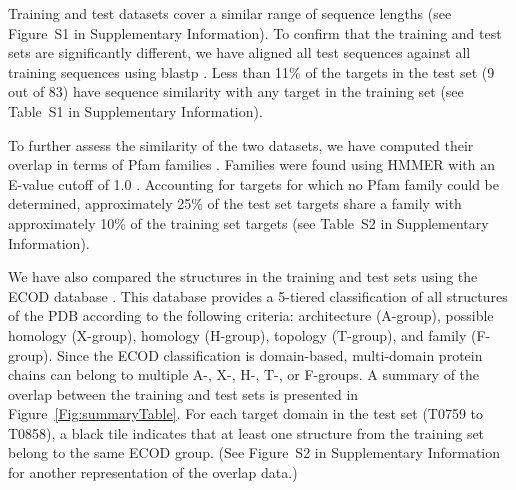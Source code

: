 \documentclass{bioinfo}
\begin{document}
Training and test datasets cover a similar range of sequence
lengths (see Figure~S1 in Supplementary Information). To confirm that the
training and test sets are significantly different, we have aligned
all test sequences against all training sequences using
blastp \citep{altschul1990basic}.  Less than 11\% of the targets in the
test set (9 out of 83) have sequence similarity with any target in the
training set (see Table~S1 in Supplementary Information).

To further assess the similarity of the two datasets, we have computed
their overlap in terms of Pfam families \citep{finn2016pfam}. 
Families were found using HMMER \citep{finn2015hmmer} with an E-value
cutoff of 1.0 \citep{finn2016pfam}.  Accounting for targets for which
no Pfam family could be determined, approximately 25\% of the test set
targets share a family with approximately 10\% of the training set
targets (see Table~S2 in Supplementary Information).

We have also compared the structures in the training and test sets
using the ECOD database \citep{cheng2014ecod}. This database provides a
5-tiered classification of all structures of the PDB
according to the following criteria:
architecture (A-group), possible homology (X-group), homology
(H-group), topology (T-group), and family (F-group).  Since the ECOD
classification is domain-based, multi-domain protein chains can belong
to multiple A-, X-, H-, T-, or F-groups.
%
A summary of the overlap between the training and test sets is
presented in Figure~\ref{Fig:summaryTable}. For each target domain in
the test set (T0759 to T0858), a black tile indicates that at least
one structure from the training set belong to the same ECOD
group. (See Figure~S2 in Supplementary Information for another
representation of the overlap data.)
\end{document}
